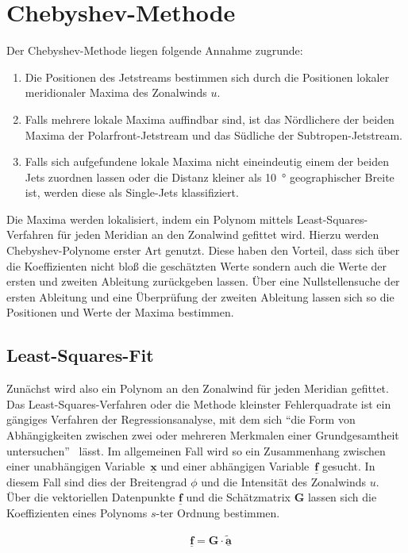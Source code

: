 \section{Chebyshev-Methode}
Der Chebyshev-Methode liegen folgende Annahme zugrunde:
\begin{enumerate}
  \item Die Positionen des Jetstreams bestimmen sich durch die Positionen lokaler meridionaler Maxima des Zonalwinds $u$.
  \item Falls mehrere lokale Maxima auffindbar sind, ist das Nördlichere der beiden Maxima der Polarfront-Jetstream und das Südliche der Subtropen-Jetstream.
  \item Falls sich aufgefundene lokale Maxima nicht eineindeutig einem der beiden Jets zuordnen lassen oder die Distanz kleiner als \SI{10}{\degree} geographischer Breite ist, werden diese als Single-Jets klassifiziert.
\end{enumerate}
Die Maxima werden lokalisiert, indem ein Polynom mittels Least-Squares-Verfahren für jeden Meridian an den Zonalwind gefittet wird. Hierzu werden Chebyshev-Polynome erster Art genutzt. Diese haben den Vorteil, dass sich über die Koeffizienten nicht bloß die geschätzten Werte sondern auch die Werte der ersten und zweiten Ableitung zurückgeben lassen. Über eine Nullstellensuche der ersten Ableitung und eine Überprüfung der zweiten Ableitung lassen sich so die Positionen und Werte der Maxima bestimmen.

\subsection{Least-Squares-Fit}
Zunächst wird also ein Polynom an den Zonalwind für jeden Meridian gefittet. Das Least-Squares-Verfahren oder die Methode kleinster Fehlerquadrate ist ein gängiges Verfahren der Regressionsanalyse, mit dem sich \enquote{die Form von Abhängigkeiten zwischen zwei  oder mehreren Merkmalen einer Grundgesamtheit untersuchen}~\citep{bronstein-2006} lässt. Im allgemeinen Fall wird so ein Zusammenhang zwischen einer unabhängigen Variable~$\underline{\boldsymbol{x}}$ und einer abhängigen Variable~$\underline{\boldsymbol{f}}$ gesucht. In diesem Fall sind dies der Breitengrad $\phi$ und die Intensität des Zonalwinds $u$. Über die vektoriellen Datenpunkte $\underline{\boldsymbol{f}}$ und die Schätzmatrix $\boldsymbol{G}$ lassen sich die Koeffizienten eines Polynoms $s$-ter Ordnung bestimmen.

\begin{align}
& \underline{\boldsymbol{f}} = \boldsymbol{G} \cdot \underline{\boldsymbol{\tilde{a}}}
\end{align}

